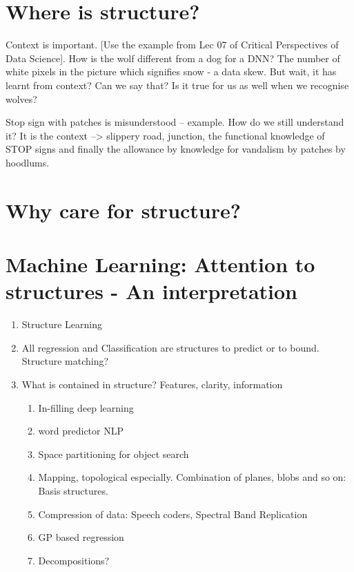 \section{Where is structure?}
Context is important. [Use the example from Lec 07 of Critical Perspectives of Data Science]. How is the wolf different from a dog for a DNN? The number of white pixels in the picture which signifies snow - a data skew. But wait, it has learnt from context? Can we say that? Is it true for us as well when we recognise wolves?

Stop sign with patches is misunderstood -- example. How do we still understand it? It is the context --> slippery road, junction, the functional knowledge of STOP signs and finally the allowance by knowledge for vandalism by patches by hoodlums.

\section{Why care for structure?}
\section{Machine Learning: Attention to structures - An interpretation}
\begin{enumerate}
\item Structure Learning
\item All regression and Classification are structures to predict or to bound. Structure matching?
\item What is contained in structure? Features, clarity, information
\begin{enumerate}
\item In-filling deep learning
\item word predictor NLP
\item Space partitioning for object search
\item Mapping, topological especially. Combination of planes, blobs and so on: Basis structures.
\item Compression of data: Speech coders, Spectral Band Replication
\item GP based regression
\item Decompositions?
\end{enumerate}
\end{enumerate}

